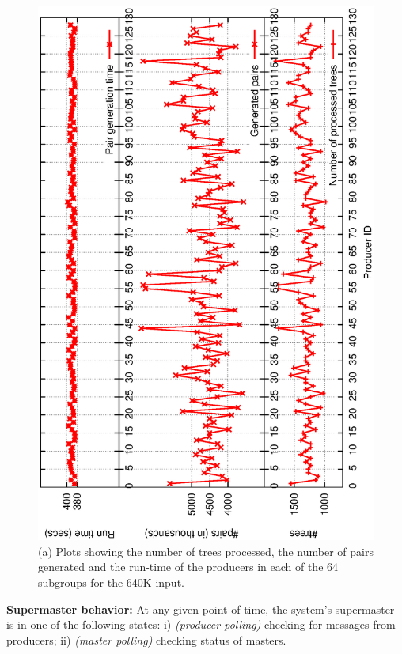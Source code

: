 \documentclass[10pt,journal,letterpaper,compsoc]{IEEEtran}
\begin{document}
\begin{figure}[h]
\centerline{
            \includegraphics[angle=-90, scale=0.33]{producer.eps}
}
\caption{
(a) Plots showing the number of trees processed, the number of pairs generated and the run-time of the producers in each of the 64 subgroups for the 640K input.
}
\label{figProducer}
\end{figure}



{\bf Supermaster behavior:} At any given point of time, the system's supermaster is in one of the following states: i) \emph{(producer polling)} checking for messages from producers; ii) \emph{(master polling)} checking status of masters. 
\end{document}
